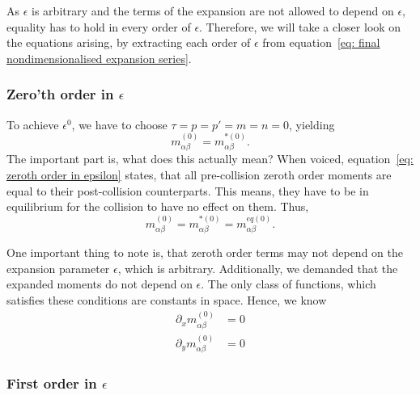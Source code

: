 As $\epsilon$ is arbitrary and the terms of the expansion are not allowed to depend on $\epsilon$, equality has to hold in every order of $\epsilon$.
Therefore, we will take a closer look on the equations arising, by extracting each order of $\epsilon$ from equation~\eqref{eq: final nondimensionalised expansion series}.

\subsubsection{Zero'th order in \texorpdfstring{$\epsilon$}{epsilon}}
\label{subs: Zeroth order in epsilon}

To achieve $\epsilon^0$, we have to choose $\tau=p=p'=m=n=0$, yielding
\begin{equation}
  \label{eq: zeroth order in epsilon}
  m_{\alpha\beta}^{(0)} = m_{\alpha\beta}^{*(0)}.
\end{equation}
The important part is, what does this actually mean?
When voiced, equation~\eqref{eq: zeroth order in epsilon} states, that all pre-collision zeroth order moments are equal to their post-collision counterparts.
This means, they have to be in equilibrium for the collision to have no effect on them.
Thus,
\begin{equation}
  \label{eq: zeroth order invariant}
  m_{\alpha\beta}^{(0)} = m_{\alpha\beta}^{*(0)} = m_{\alpha\beta}^{eq(0)}.
\end{equation}

One important thing to note is, that zeroth order terms may not depend on the expansion parameter $\epsilon$, which is arbitrary.
Additionally, we demanded that the expanded moments do not depend on $\epsilon$.
The only class of functions, which satisfies these conditions are constants in space.
Hence, we know
\begin{equation}
  \label{eq: derivative of zeroth order}
  \begin{aligned}
    \partial_x m_{\alpha\beta}^{(0)} &= 0 \\
    \partial_y m_{\alpha\beta}^{(0)} &= 0
  \end{aligned}
\end{equation}

\subsubsection{First order in \texorpdfstring{$\epsilon$}{epsilon}}
\label{subs: First order in epsilon}

